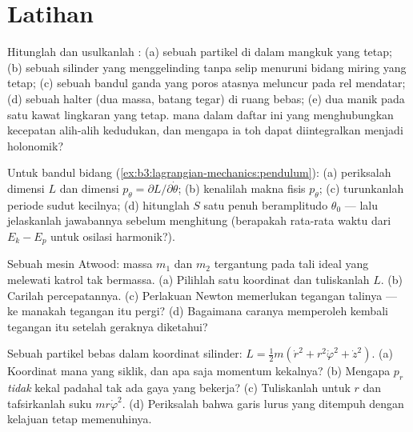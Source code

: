 \section{Latihan}

\begin{exercise}[$\star$]\label{exo:b3:lagrangian-mechanics:1}
Hitunglah  dan usulkanlah : (a)
sebuah partikel di dalam mangkuk yang tetap; (b) sebuah silinder yang
menggelinding tanpa selip menuruni bidang miring yang tetap; (c) sebuah
bandul ganda yang poros atasnya meluncur pada rel mendatar; (d) sebuah
halter (dua massa, batang tegar) di ruang bebas; (e) dua manik pada satu
kawat lingkaran yang tetap.  mana dalam daftar ini yang
menghubungkan kecepatan alih-alih kedudukan, dan mengapa ia toh dapat
diintegralkan menjadi  holonomik?
\end{exercise}

\begin{exercise}[$\star$]\label{exo:b3:lagrangian-mechanics:2}
Untuk bandul bidang (\cref{ex:b3:lagrangian-mechanics:pendulum}):
(a) periksalah dimensi $L$ dan dimensi $p_\theta =
\partial L/\partial\dot\theta$; (b) kenalilah makna fisis $p_\theta$;
(c) turunkanlah periode sudut kecilnya; (d) hitunglah  $S$ satu
 penuh beramplitudo $\theta_0$ --- lalu jelaskanlah
jawabannya sebelum menghitung (berapakah rata-rata waktu dari
$E_k - E_p$ untuk osilasi harmonik?).
\end{exercise}

\begin{exercise}[$\star$]\label{exo:b3:lagrangian-mechanics:3}
Sebuah mesin Atwood: massa $m_1$ dan $m_2$ tergantung pada tali ideal
yang melewati katrol tak bermassa. (a) Pilihlah satu koordinat dan
tuliskanlah $L$. (b) Carilah percepatannya. (c) Perlakuan Newton
memerlukan tegangan talinya --- ke manakah tegangan itu pergi? (d)
Bagaimana caranya memperoleh kembali tegangan itu setelah geraknya
diketahui?
\end{exercise}

\begin{exercise}[$\star$]\label{exo:b3:lagrangian-mechanics:4}
Sebuah partikel bebas dalam koordinat silinder: $L = \tfrac12 m(\dot r^2 +
r^2\dot\varphi^2 + \dot z^2)$. (a) Koordinat mana yang siklik, dan
apa saja momentum kekalnya? (b) Mengapa $p_r$ \emph{tidak} kekal
padahal tak ada gaya yang bekerja? (c) Tuliskanlah  untuk $r$ dan tafsirkanlah suku $mr\dot\varphi^2$.
(d) Periksalah bahwa garis lurus yang ditempuh dengan kelajuan tetap
memenuhinya.
\end{exercise}

